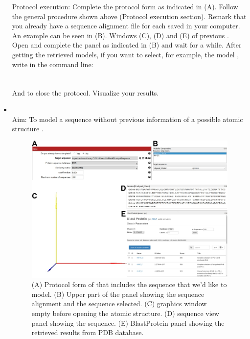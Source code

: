 \begin{itemize}
                Protocol execution: Complete the protocol form as indicated in  (A). Follow the general procedure shown above (Protocol execution section). Remark that you already have a sequence alignment file for each  saved in your computer. An example can be seen in  (B). Windows (C), (D) and (E) of previous . Open and complete the  panel as indicated in (B) and wait for a while. After getting the retrieved models, if you want to select, for example, the  model , write in the command line:\\
                \\
                \\
                And \chimera {} to close the protocol. Visualize your results.
                            
                \item {}\\
                Aim: To model a  sequence without previous information of a possible atomic structure .

 
                            \begin{figure}[H]
                            \centering 
                            \captionsetup{width=.9\linewidth} 
                            \includegraphics[width=.9\textwidth]{Images_appendix/Fig308.pdf}
                            \caption{(A) Protocol form of  that includes the  sequence that we'd like to model. (B) Upper part of the \chimera {} panel showing the sequence alignment and the  sequence selected. (C) \chimera graphics window empty before opening the  atomic structure. (D) \chimera sequence view panel showing the  sequence. (E) \chimera BlastProtein panel showing the retrieved results from PDB database.}
                            \label{fig:app_protocol_seqHomology_5} 
                            \end{figure}
                            

\end{itemize}
